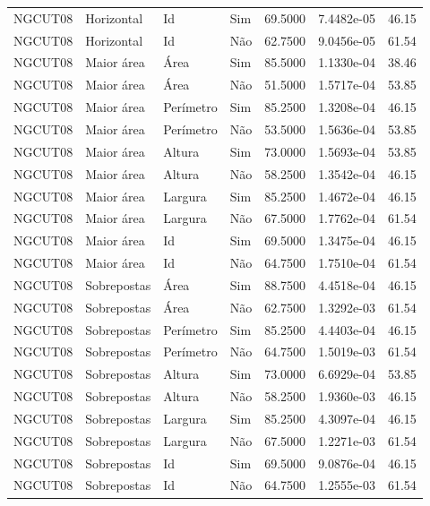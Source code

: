 \begin{tabular}{llllrrr}
    NGCUT08   & Horizontal  & Id        & Sim         & 69.5000      & 7.4482e-05 & 46.15    \\
    NGCUT08   & Horizontal  & Id        & Não         & 62.7500      & 9.0456e-05 & 61.54    \\
    NGCUT08   & Maior área  & Área      & Sim         & 85.5000      & 1.1330e-04 & 38.46    \\
    NGCUT08   & Maior área  & Área      & Não         & 51.5000      & 1.5717e-04 & 53.85    \\
    NGCUT08   & Maior área  & Perímetro & Sim         & 85.2500      & 1.3208e-04 & 46.15    \\
    NGCUT08   & Maior área  & Perímetro & Não         & 53.5000      & 1.5636e-04 & 53.85    \\
    NGCUT08   & Maior área  & Altura    & Sim         & 73.0000      & 1.5693e-04 & 53.85    \\
    NGCUT08   & Maior área  & Altura    & Não         & 58.2500      & 1.3542e-04 & 46.15    \\
    NGCUT08   & Maior área  & Largura   & Sim         & 85.2500      & 1.4672e-04 & 46.15    \\
    NGCUT08   & Maior área  & Largura   & Não         & 67.5000      & 1.7762e-04 & 61.54    \\
    NGCUT08   & Maior área  & Id        & Sim         & 69.5000      & 1.3475e-04 & 46.15    \\
    NGCUT08   & Maior área  & Id        & Não         & 64.7500      & 1.7510e-04 & 61.54    \\
    NGCUT08   & Sobrepostas & Área      & Sim         & 88.7500      & 4.4518e-04 & 46.15    \\
    NGCUT08   & Sobrepostas & Área      & Não         & 62.7500      & 1.3292e-03 & 61.54    \\
    NGCUT08   & Sobrepostas & Perímetro & Sim         & 85.2500      & 4.4403e-04 & 46.15    \\
    NGCUT08   & Sobrepostas & Perímetro & Não         & 64.7500      & 1.5019e-03 & 61.54    \\
    NGCUT08   & Sobrepostas & Altura    & Sim         & 73.0000      & 6.6929e-04 & 53.85    \\
    NGCUT08   & Sobrepostas & Altura    & Não         & 58.2500      & 1.9360e-03 & 46.15    \\
    NGCUT08   & Sobrepostas & Largura   & Sim         & 85.2500      & 4.3097e-04 & 46.15    \\
    NGCUT08   & Sobrepostas & Largura   & Não         & 67.5000      & 1.2271e-03 & 61.54    \\
    NGCUT08   & Sobrepostas & Id        & Sim         & 69.5000      & 9.0876e-04 & 46.15    \\
    NGCUT08   & Sobrepostas & Id        & Não         & 64.7500      & 1.2555e-03 & 61.54    \\
    \hline
\end{tabular}